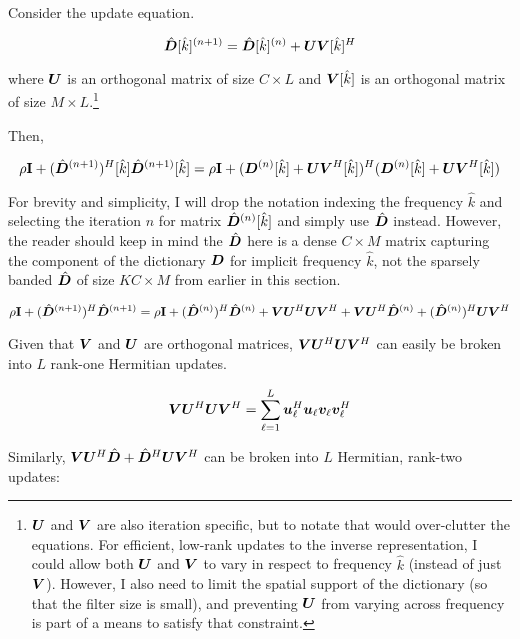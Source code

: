 Consider the update equation.

\begin{equation}
\hat{\bm{D}}[\hat{k}]^{(n + 1)} = \hat{\bm{D}}[\hat{k}]^{(n)} + \bm{U}\bm{V}[\hat{k}]^H
\end{equation}

where $\bm{U}$ is an orthogonal matrix of size $C \times L$ and $\bm{V}[\hat{k}]$ is an orthogonal matrix of size $M \times L$.\footnote{$\bm{U}$ and $\bm{V}$ are also iteration specific, but to notate that would over-clutter the equations. For efficient, low-rank updates to the inverse representation, I could allow both $\bm{U}$ and $\bm{V}$ to vary in respect to frequency $\hat{k}$ (instead of just $\bm{V}$). However, I also need to limit the spatial support of the dictionary (so that the filter size is small), and preventing $\bm{U}$ from varying across frequency is part of a means to satisfy that constraint.}

Then,

\begin{equation}
\rho{\bf I} + (\hat{\bm{D}}^{(n + 1)})^H[\hat{k}]\hat{\bm{D}}^{(n + 1)}[\hat{k}] = \rho{\bf I} + (\bm{D}^{(n)}[\hat{k}] + \bm{U}\bm{V}^H[\hat{k}])^H(\bm{D}^{(n)}[\hat{k}] + \bm{U}\bm{V}^H[\hat{k}])
\end{equation}

For brevity and simplicity, I will drop the notation indexing the frequency $\hat{k}$ and selecting the iteration $n$ for matrix $\hat{\bm{D}}^{(n)}[\hat{k}]$ and simply use $\hat{\bm{D}}$ instead. However, the reader should keep in mind the $\hat{\bm{D}}$ here is a dense $C \times M$ matrix capturing the component of the dictionary $\bm{D}$ for implicit frequency $\hat{k}$, not the sparsely banded $\hat{\bm{D}}$ of size $KC \times M$ from earlier in this section.

\begin{equation}
\rho{\bf I} + (\hat{\bm{D}}^{(n + 1)})^H\hat{\bm{D}}^{(n + 1)} = \rho{\bf I} + (\hat{\bm{D}}^{(n)})^H\hat{\bm{D}}^{(n)} + \bm{V}\bm{U}^H \bm{U}\bm{V}^H + \bm{V}\bm{U}^H\hat{\bm{D}}^{(n)} + (\hat{\bm{D}}^{(n)})^H\bm{U}\bm{V}^H
\end{equation}

Given that $\bm{V}$ and $\bm{U}$ are orthogonal matrices, $\bm{V}\bm{U}^H\bm{U}\bm{V}^H$ can easily be broken into $L$ rank-one Hermitian updates.

\begin{equation}
\bm{V}\bm{U}^H\bm{U}\bm{V}^H = \sum_{\ell = 1}^L \bm{u}_{\ell}^H\bm{u}_{\ell}\bm{v}_{\ell}\bm{v}_{\ell}^H
\end{equation}

Similarly, $\bm{V}\bm{U}^H\hat{\bm{D}} + \hat{\bm{D}}^H\bm{U}\bm{V}^H$ can be broken into $L$ Hermitian, rank-two updates:

